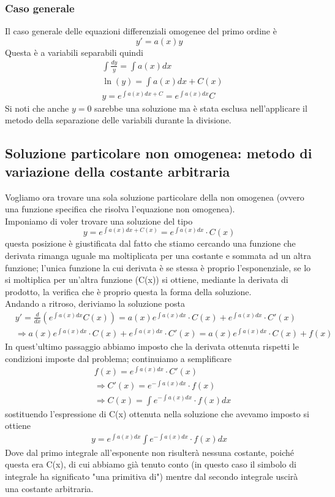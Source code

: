 \documentclass[10pt,a4paper]{article}
\begin{document}
\subsubsection{Caso generale}
Il caso generale delle equazioni differenziali omogenee del primo ordine è
\[y'=a(x)y\]
Questa è a variabili separabili quindi
\begin{align*}
	&\int\frac{dy}{y} = \int a(x)dx\\
	&\ln(y) = \int a(x) dx + C(x)\\
	&y = e^{\int a(x)dx + C} = e^{\int a(x)dx} C
\end{align*}
Si noti che anche \(y=0\) sarebbe una soluzione ma è stata esclusa nell'applicare il metodo della separazione delle variabili durante la divisione.
\subsection{Soluzione particolare non omogenea: metodo di variazione della costante arbitraria}
Vogliamo ora trovare una sola soluzione particolare della non omogenea (ovvero una funzione specifica che risolva l'equazione non omogenea).\\
Imponiamo di voler trovare una soluzione del tipo
\[y = e^{\int a(x)dx+C(x)} =e^{\int a(x)dx}\cdot C(x) \]
questa posizione è giustificata dal fatto che stiamo cercando una funzione che derivata rimanga uguale ma moltiplicata per una costante e sommata ad un altra funzione; l'unica funzione la cui derivata è se stessa è proprio l'esponenziale, se lo si moltiplica per un'altra funzione (C(x)) si ottiene, mediante la derivata di prodotto, la verifica che è proprio questa la forma della soluzione.\\
Andando a ritroso, deriviamo la soluzione posta
\begin{align*}
	&y'=\frac{d}{dx}( e^{\int a(x)dx}C(x) )= a(x)e^{\int a(x)dx}\cdot C(x) + e^{\int a(x)dx}\cdot C'(x)\\
	&\Rightarrow a(x)e^{\int a(x)dx}\cdot C(x) + e^{\int a(x)dx}\cdot C'(x)= a(x) e^{\int a(x)dx}\cdot C(x)+f(x)
\end{align*}
In quest'ultimo passaggio abbiamo imposto che la derivata ottenuta rispetti le condizioni imposte dal problema; continuiamo a semplificare
\begin{align*}
 &f(x) = e^{\int a(x)dx}\cdot C'(x)\\
 &\Rightarrow C'(x) = e^{-\int a(x)dx}\cdot f(x)\\
 &\Rightarrow C(x) = \int e^{-\int a(x)dx}\cdot f(x) dx
\end{align*}
sostituendo l'espressione di C(x) ottenuta nella soluzione che avevamo imposto si ottiene
\begin{align*}\label{eq:variazcost}
	y = e^{\int a(x)dx} \int e^{-\int a(x)dx}\cdot f(x) dx
\end{align*}  
Dove dal primo integrale all'esponente non risulterà nessuna costante, poiché questa era C(x), di cui abbiamo già tenuto conto (in questo caso il simbolo di integrale ha significato "una primitiva di") mentre dal secondo integrale uscirà una costante arbitraria.
\end{document}
